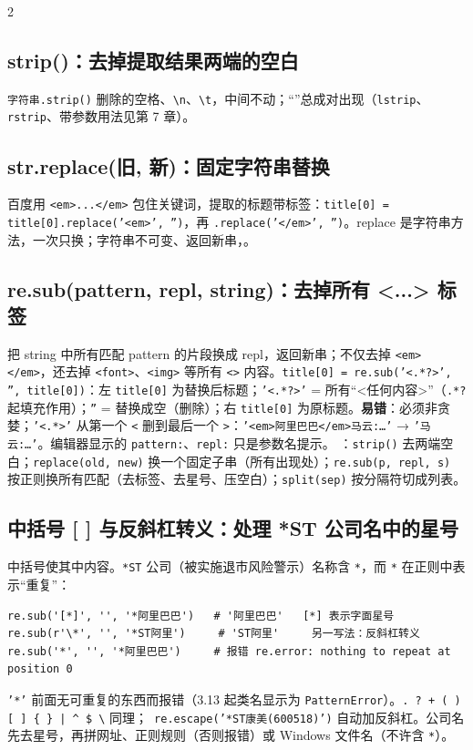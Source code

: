 \begin{multicols}{2}\raggedcolumns\sloppy
\subsection{strip()：去掉提取结果两端的空白}
\texttt{字符串.strip()} 删除的空格、\texttt{\textbackslash n}、\texttt{\textbackslash t}，中间不动；“”总成对出现（\texttt{lstrip}、\texttt{rstrip}、带参数用法见第 7 章）。

\subsection{str.replace(旧, 新)：固定字符串替换}
百度用 \texttt{<em>...</em>} 包住关键词，提取的标题带标签：\texttt{title[0] = title[0].replace('<em>', '')}，再 \texttt{.replace('</em>', '')}。replace 是字符串方法，一次只换；字符串不可变、返回新串，。

\subsection{re.sub(pattern, repl, string)：去掉所有 <...> 标签}
把 string 中所有匹配 pattern 的片段换成 repl，返回新串；不仅去掉 \texttt{<em></em>}，还去掉 \texttt{<font>}、\texttt{<img>} 等所有 \texttt{<>} 内容。\texttt{title[0] = re.sub('<.*?>', '', title[0])}：左 \texttt{title[0]} 为替换后标题；\texttt{'<.*?>'} = 所有“<任何内容>”（\texttt{.*?} 起填充作用）；\texttt{''} = 替换成空（删除）；右 \texttt{title[0]} 为原标题。\textbf{易错}：必须非贪婪；\texttt{'<.*>'} 从第一个 \texttt{<} 删到最后一个 \texttt{>}：\texttt{'<em>阿里巴巴</em>马云:…'} → \texttt{'马云:…'}。编辑器显示的 \texttt{pattern:}、\texttt{repl:} 只是参数名提示。
：\texttt{strip()} 去两端空白；\texttt{replace(old, new)} 换一个固定子串（所有出现处）；\texttt{re.sub(p, repl, s)} 按正则换所有匹配（去标签、去星号、压空白）；\texttt{split(sep)} 按分隔符切成列表。
\end{multicols}

\subsection{中括号 [ ] 与反斜杠转义：处理 *ST 公司名中的星号}\label{sec:D06-star}
中括号使其中内容。\texttt{*ST} 公司（被实施退市风险警示）名称含 \texttt{*}，而 \texttt{*} 在正则中表示“重复”：
\begin{lstlisting}[style=pyD06]
re.sub('[*]', '', '*阿里巴巴')   # '阿里巴巴'   [*] 表示字面星号
re.sub(r'\*', '', '*ST阿里')     # 'ST阿里'     另一写法：反斜杠转义
re.sub('*', '', '*阿里巴巴')     # 报错 re.error: nothing to repeat at position 0
\end{lstlisting}
\texttt{'*'} 前面无可重复的东西而报错（3.13 起类名显示为 \texttt{PatternError}）。\texttt{. ? + ( ) [ ] \{ \} | \^{} \$ \textbackslash} 同理；\tagext\ \texttt{re.escape('*ST康美(600518)')} 自动加反斜杠。公司名先去星号，再拼网址、正则规则（否则报错）或 Windows 文件名（不许含 \texttt{*}）。

